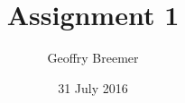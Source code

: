 \newcommand{\usqcoursecode}{MAT8190}
\newcommand{\usqcoursedescription}{Numerical Computation}
\title{Assignment 1}
\author{Geoffry Breemer}
\newcommand{\usqstudentnumber}{0061082147}
\newcommand{\usqstudentemail}{u1082147@umail.usq.edu.au}
\newcommand{\usqacademicyear}{2016}
\newcommand{\usqacademicsemester}{2}
\date{31 July 2016}
\newcommand{\usqpreparedfor}{Dr Harry Butler}
\newcommand{\usqpreparedforposition}{Senior Lecturer (Mathematics and Computing)}
\newcommand{\usqpreparedfororganisation}{School of Agricultural, Computational and Environmental}